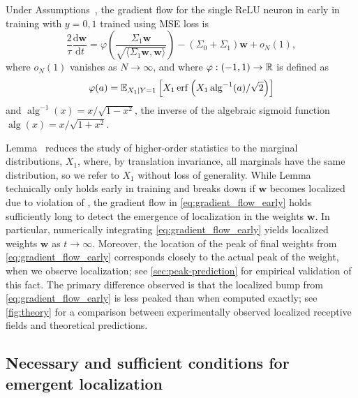 \begin{lemma} \label{lem:gradient_flow}
    Under Assumptions~,
    the gradient flow for the single ReLU neuron in  early in training with $y = 0, 1$ 
    trained using MSE loss is
    \begin{equation} \label{eq:gradient_flow_early}
      \frac{2}{\tau} \frac{\mathrm{d}\mathbf{w}}{\mathrm{d}t} = \varphi\left( \frac{\Sigma_1 \mathbf{w}}{\sqrt{\langle \Sigma_1 \mathbf{w}, \mathbf{w} \rangle}} \right) - ( \Sigma_0 + \Sigma_1 ) \mathbf{w} + o_N(1),
    \end{equation}
    where $o_N(1)$ vanishes as $N\to\infty$, and where $\varphi : (-1,1) \to \operatorname{\mathbb{R}}$ is defined as
    \begin{equation} \label{eq:varphi}
        \varphi(a) = \operatorname{\mathbb{E}}_{X_1 \mid Y = 1}\left[ X_1 \operatorname{erf}\left( X_1 \operatorname{alg}^{-1}(a) / \sqrt{2} \right)
        \right]
    \end{equation}
    and $\operatorname{alg}^{-1}(x) = x/\sqrt{1-x^2}$, the inverse of the algebraic sigmoid function $\operatorname{alg}(x) = x/\sqrt{1+x^2}$.
\end{lemma}
Lemma~ reduces the study of higher-order statistics to the marginal distributions, $X_1$, where, by translation invariance, all marginals have the same distribution, so we refer to $X_1$ without loss of generality.
While Lemma~ technically only holds early in training and breaks down if $\mathbf{w}$ becomes localized due to violation of , the gradient flow in \cref{eq:gradient_flow_early} holds sufficiently long to detect the emergence of localization in the weights $\mathbf{w}$.
In particular, numerically integrating \cref{eq:gradient_flow_early} yields localized weights $\mathbf{w}$ as $t \to \infty$.
Moreover, the location of the peak of final weights from \cref{eq:gradient_flow_early} corresponds closely to the actual peak of the weight, when we observe localization; see \cref{sec:peak-prediction} 
for empirical validation of this fact.
The primary difference observed is that the localized bump from \cref{eq:gradient_flow_early} is less peaked than when computed exactly; see \cref{fig:theory} for a comparison between experimentally observed localized receptive fields and theoretical predictions.

\subsection{Necessary and sufficient conditions for emergent localization}
\label{subsec:localization_conditions}

